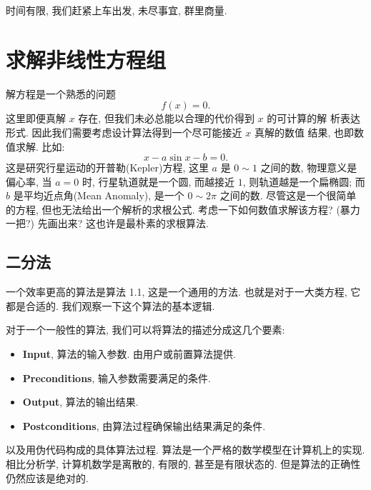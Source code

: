 \documentclass[a4paper]{ctexart}
\newcommand{\remark}[1]
{\noindent {\bf Remark {#1}}}
\begin{document}
时间有限, 我们赶紧上车出发, 未尽事宜, 群里商量.


\section{求解非线性方程组}
\label{sec::sne}

\remark{1.1} 解方程是一个熟悉的问题
\begin{equation}
  f(x) = 0.
  \label{eq::ge}
\end{equation}
这里即便真解 $x$ 存在, 但我们未必总能以合理的代价得到 $x$ 的可计算的解
析表达形式. 因此我们需要考虑设计算法得到一个尽可能接近 $x$ 真解的数值
结果, 也即数值求解. 比如:
\begin{equation}
  x - a \sin x - b = 0.
  \label{eq::Kepler}
\end{equation}
这是研究行星运动的开普勒(Kepler)方程, 这里 $a$ 是 $0 \sim 1$ 之间的数, 物理意义是偏心率, 
当 $a = 0$ 时, 行星轨道就是一个圆, 而越接近 $1$, 则轨道越是一个扁椭圆; 而 $b$ 是平均近点角(Mean Anomaly), 
是一个 $0 \sim 2 \pi$ 之间的数. 尽管这是一个很简单的方程, 但也无法给出一个解析的求根公式. 
考虑一下如何数值求解该方程? (暴力一把?) 先画出来? 这也许是最朴素的求根算法.

\subsection{二分法}
一个效率更高的算法是算法 1.1, 这是一个通用的方法. 也就是对于一大类方程, 它都是合适的. 
我们观察一下这个算法的基本逻辑.

对于一个一般性的算法, 我们可以将算法的描述分成这几个要素:
\begin{itemize}
  \item {\bf Input}, 算法的输入参数. 由用户或前置算法提供.
  \item {\bf Preconditions}, 输入参数需要满足的条件. 
  \item {\bf Output}, 算法的输出结果.
  \item {\bf Postconditions}, 由算法过程确保输出结果满足的条件.
\end{itemize}
以及用伪代码构成的具体算法过程. 算法是一个严格的数学模型在计算机上的实现. 
相比分析学, 计算机数学是离散的, 有限的, 甚至是有限状态的. 
但是算法的正确性仍然应该是绝对的.
\end{document}
